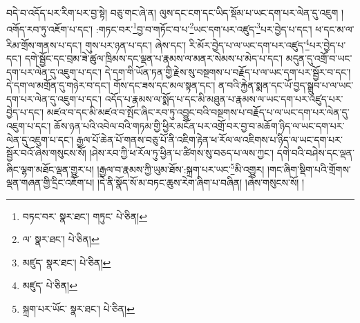 བདེ་བ་འདོད་པར་རིག་པར་བྱ་སྟེ། བཅུ་གང་ཞེ་ན། ལུས་དང་ངག་དང་ཡིད་སྡོམ་པ་ཡང་དག་པར་ལེན་དུ་འཇུག །འགོད་རབ་ཏུ་འཇོག་པ་དང་། :གཏང་བར་\footnote{བཏང་བར་  སྣར་ཐང་། གཏུང་  པེ་ཅིན། }བྱ་བ་གཏོང་བ་པ་\footnote{ལ་  སྣར་ཐང་།  པེ་ཅིན། }ཡང་དག་པར་འཛུད་\footnote{མཛུད་  སྣར་ཐང་།  པེ་ཅིན། }པར་བྱེད་པ་དང་། ཕ་དང་མ་ལ་རིམ་གྲོས་གནས་པ་དང་། གུས་པར་ཉན་པ་དང་། ཞེས་དང་། རི་མོར་བྱེད་པ་ལ་ཡང་དག་པར་འཛུད་\footnote{མཛུད་  པེ་ཅིན། }པར་བྱེད་པ་དང་། དགེ་སྦྱོང་དང་བྲམ་ཟེ་ཚུལ་ཁྲིམས་དང་ལྡན་པ་རྣམས་ལ་མནར་སེམས་པ་མེད་པ་དང་། མདུན་དུ་འགྲོ་བ་ཡང་དག་པར་ལེན་དུ་འཇུག་པ་དང་། དེ་དག་གི་ཡོན་ཏན་གྱི་རྗེས་སུ་བསྔགས་པ་བརྗོད་པ་ལ་ཡང་དག་པར་སྦྱོར་བ་དང་། དེ་དག་ལ་མགྲོན་དུ་གཉེར་བ་དང་། གོས་དང་ཟས་དང་མལ་སྟན་དང་། ན་བའི་རྐྱེན་སྨན་དང་ཡོ་བྱད་སྒྲུབ་པ་ལ་ཡང་དག་པར་ལེན་དུ་འཇུག་པ་དང་། འདོད་པ་རྣམས་ལ་སྨོད་པ་དང་མི་མཐུན་པ་རྣམས་ལ་ཡང་དག་པར་འཛུད་པར་བྱེད་པ་དང་། མཛའ་བ་དང་མི་མཛའ་བ་སྤོང་ཞིང་རབ་ཏུ་འབྱུང་བའི་བསྔགས་པ་བརྗོད་པ་ལ་ཡང་དག་པར་ལེན་དུ་འཇུག་པ་དང་། ཆོས་ཉན་པའི་འབེལ་བའི་གཏམ་གྱི་ཕྱིར་མངོན་པར་འགྲོ་བར་བྱ་བ་མཆོག་ཉིད་ལ་ཡང་དག་པར་ལེན་དུ་འཇུག་པ་དང་། རྒྱལ་པོ་ཆེན་པོ་གནས་བཅུ་པོ་ནི་འཇིག་རྟེན་ཕ་རོལ་ལ་འཇིགས་པ་ཉིད་ལ་ཡང་དག་པར་སྦྱོར་བའོ་ཞེས་གསུངས་སོ། །ཤེས་རབ་ཀྱི་ཕ་རོལ་ཏུ་ཕྱིན་པ་ཚིགས་སུ་བཅད་པ་ལས་ཀྱང་། དགེ་བའི་བཤེས་དང་ལྡན་ཞིང་ལྷག་མཐོང་ལྡན་གྱུར་པ། །རྒྱལ་བ་རྣམས་ཀྱི་ཡུམ་ཐོས་:སྐྲག་པར་ཡང་\footnote{སྐྲག་པར་ཡོང་  སྣར་ཐང་།  པེ་ཅིན། }མི་འགྱུར། །གང་ཞིག་སྡིག་པའི་གྲོགས་ལྡན་གཞན་གྱི་དྲིང་འཇོག་པ། །དེ་ནི་སྣོད་སོ་མ་བཏང་ཆུས་རེག་ཞིག་པ་བཞིན། །ཞེས་གསུངས་སོ། །
